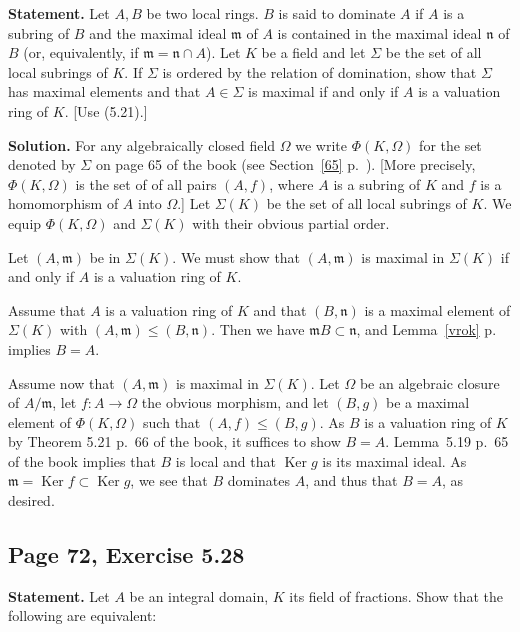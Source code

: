 \documentclass[parskip=half,fontsize=12pt]{scrartcl}%
\newcommand{\mf}{\mathfrak}
\newcommand{\mmm}{\mf m}
\newcommand{\nnn}{\mf n}
\newcommand{\Ker}{\operatorname{Ker}}\newcommand{\Coker}{\operatorname{Coker}}
\begin{document}
\textbf{Statement.} Let $A,B$ be two local rings. $B$ is said to dominate $A$ if $A$ is a subring of $B$ and the maximal ideal $\mmm$ of $A$ is contained in the maximal ideal $\nnn$ of $B$ (or, equivalently, if $\mmm=\nnn\cap A$). Let $K$ be a field and let $\Sigma$ be the set of all local subrings of $K$. If $\Sigma$ is ordered by the relation of domination, show that $\Sigma$ has maximal elements and that $A\in\Sigma$ is maximal if and only if $A$ is a valuation ring of $K$. [Use (5.21).]

\textbf{Solution.} For any algebraically closed field $\Omega$ we write $\Phi(K,\Omega)$ for the set denoted by $\Sigma$ on page 65 of the book (see Section~\ref{65} p.~\pageref{65}). [More precisely, $\Phi(K,\Omega)$ is the set of of all pairs $(A,f)$, where $A$ is a subring of $K$ and $f$ is a homomorphism of $A$ into $\Omega$.] %
Let $\Sigma(K)$ be the set of all local subrings of $K$. We equip $\Phi(K,\Omega)$ and $\Sigma(K)$ with their obvious partial order.

Let $(A,\mmm)$ be in $\Sigma(K)$. We must show that $(A,\mmm)$ is maximal in $\Sigma(K)$ if and only if $A$ is a valuation ring of $K$.

Assume that $A$ is a valuation ring of $K$ and that $(B,\nnn)$ is a maximal element of $\Sigma(K)$ with $(A,\mmm)\le(B,\nnn)$. Then we have $\mmm B\subset\nnn$, and Lemma~\ref{vrok} p.~\pageref{vrok} implies $B=A$. %

Assume now that $(A,\mmm)$ is maximal in $\Sigma(K)$. Let $\Omega$ be an algebraic closure of $A/\mmm$, let $f:A\to\Omega$ the obvious morphism, and let $(B,g)$ be a maximal element of $\Phi(K,\Omega)$ such that $(A,f)\le(B,g)$. As $B$ is a valuation ring of $K$ by Theorem 5.21 p.~66 of the book, it suffices to show $B=A$. Lemma~5.19 p.~65 of the book implies that $B$ is local and that $\Ker g$ is its maximal ideal. As $\mmm=\Ker f\subset\Ker g$, we see that $B$ dominates $A$, and thus that $B=A$, as desired.

\subsection{Page 72, Exercise 5.28}%

\textbf{Statement.} Let $A$ be an integral domain, $K$ its field of fractions. Show that the following are equivalent:
\end{document}
